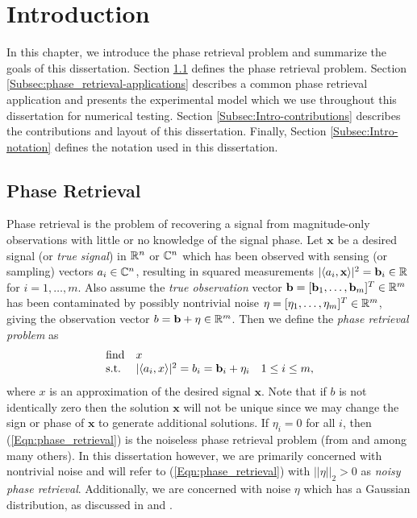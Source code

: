 \chapter{Introduction}  \label{Sec:Intro}


In this chapter, we introduce the phase retrieval problem and summarize the goals of this dissertation.
Section \ref{Subsec:phase_retrieval-math_model} defines the phase retrieval problem.
Section \ref{Subsec:phase_retrieval-applications} describes a common phase retrieval application and presents the experimental model which we use throughout this dissertation for numerical testing.
Section \ref{Subsec:Intro-contributions} describes the contributions and layout of this dissertation.
Finally, Section \ref{Subsec:Intro-notation} defines the notation used in this dissertation.


\section{Phase Retrieval}	\label{Subsec:phase_retrieval-math_model}



Phase retrieval is the problem of recovering a signal from magnitude-only observations with little or no knowledge of the signal phase.  
Let $\mathbf{x}$ be a desired signal (or \textit{true signal}) in ${\mathbb R}^n$ or ${\mathbb C}^n$ which has been observed with sensing (or sampling) vectors $a_i \in {\mathbb C}^n$, resulting in squared measurements $|\langle a_i, \mathbf{x} \rangle |^2 = \mathbf{b}_i \in {\mathbb R}$ for $i = 1, \ldots, m$.
Also assume the \textit{true observation} vector $\mathbf{b} = [\mathbf{b}_1, \ldots, \mathbf{b}_m]^T \in {\mathbb R}^m$ has been contaminated by possibly nontrivial noise $\eta = [\eta_1, \ldots, \eta_m]^T \in {\mathbb R}^m$, giving the observation vector $b = \mathbf{b} + \eta \in {\mathbb R}^m$.  Then we define the \textit{phase retrieval problem} as
\begin{equation} \label{Eqn:phase_retrieval}
\begin{array}{lll}
\textnormal{find}		&	x		\\
\textnormal{s.t.}				&	|\langle a_i, x \rangle|^2 = b_i = \mathbf{b}_i + \eta_i	&	1 \leq i \leq m,
\end{array}
\end{equation}
where $x$ is an approximation of the desired signal $\textbf{x}$.  
Note that if $b$ is not identically zero then the solution $\textbf{x}$ will not be unique since we may change the sign or phase of $\textbf{x}$ to generate additional solutions.
If $\eta_i = 0$ for all $i$, then (\ref{Eqn:phase_retrieval}) is the noiseless phase retrieval problem (from \cite{Fienup82} and  \cite{DBLP:journals/tit/CandesLS15} among many others).  In this dissertation however, we are primarily concerned with nontrivial noise and will refer to (\ref{Eqn:phase_retrieval}) with $||\eta||_2 > 0$ as \textit{noisy phase retrieval}.  Additionally, we are concerned with noise $\eta$ which has a Gaussian distribution, as discussed in \cite{DBLP:journals/siamis/CandesESV13} and \cite{DBLP:journals/siamsc/FriedlanderM16}.


